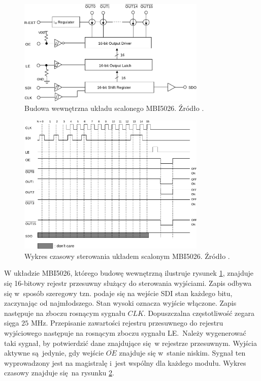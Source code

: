 \begin{figure}[tb]
    \begin{center}
       \includegraphics[width=0.8\textwidth]{figures/mbi-block.pdf}
    \end{center}

    \caption{Budowa wewnętrzna układu scalonego MBI5026. Źródło \cite{ds-mbi}.}
    \label{mbi-blokowy}
\end{figure}

\begin{figure}[tb]
    \begin{center}
       \includegraphics[width=0.8\textwidth]{figures/mbi-timings.pdf}
    \end{center}

    \caption{Wykres czasowy sterowania układem scalonym MBI5026. Źródło \cite{ds-mbi}.}
    \label{mbi-czasy}
\end{figure}

W układzie MBI5026, którego budowę wewnętrzną ilustruje rysunek \ref{mbi-blokowy}, znajduje się 16-bitowy rejestr przesuwny służący do sterowania wyjściami. Zapis odbywa się w~sposób szeregowy tzn. podaje się na wejście SDI stan każdego bitu, zaczynając od najmłodszego. Stan wysoki oznacza wyjście włączone. Zapis następuje na zboczu rosnącym sygnału $CLK$. Dopuszczalna częstotliwość zegara sięga $25$ MHz. Przepisanie zawartości rejestru przesuwnego do rejestru wyjściowego następuje na rosnącym zboczu sygnału LE.~Należy wygenerować taki sygnał, by potwierdzić dane znajdujące się w rejestrze przesuwnym. Wyjścia aktywne są jedynie, gdy wejście $\overline{OE}$ znajduje się w~stanie niskim. Sygnał ten wyprowadzony jest na magistralę i~jest wspólny dla każdego modułu. Wykres czasowy znajduje się na rysunku \ref{mbi-czasy}.

